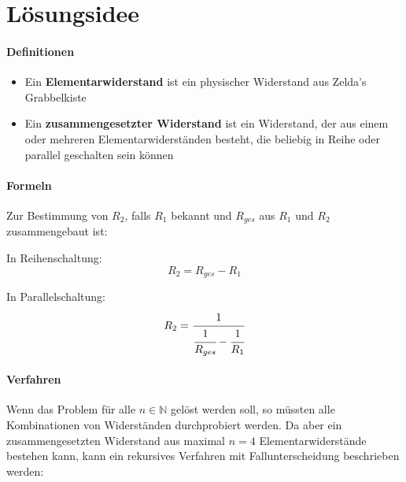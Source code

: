 \documentclass[a4paper,10pt,ngerman]{scrartcl}
\title{\Aufgabe}
\author{\Name\\Team-ID: \TeamId}
\date{\today}
\begin{document}
\maketitle
\tableofcontents

\clearpage

\section{Lösungsidee}

\paragraph{Definitionen}
\begin{itemize}
  \item Ein \textbf{Elementarwiderstand} ist ein physischer Widerstand aus Zelda's Grabbelkiste
  \item Ein \textbf{zusammengesetzter Widerstand} ist ein Widerstand, der aus einem oder mehreren Elementarwiderständen besteht, die beliebig in Reihe oder parallel geschalten sein können
\end{itemize}

\paragraph{Formeln}
Zur Bestimmung von $R_2$, falls $R_1$ bekannt und $R_{ges}$ aus $R_1$ und $R_2$ zusammengebaut ist:
\vspace{10pt}

In Reihenschaltung:
$$R_2 = R_{ges} - R_1$$ 

In Parallelschaltung:
$$R_2 = \cfrac{1}{\cfrac{1}{R_{ges}} - \cfrac{1}{R_1}}$$ 

\paragraph{Verfahren}
Wenn das Problem für alle $n \in \mathbb{N}$ gelöst werden soll, so müssten alle Kombinationen von Widerständen durchprobiert werden. Da aber ein zusammengesetzten Widerstand aus maximal $n = 4$ Elementarwiderstände bestehen kann,
kann ein rekursives Verfahren mit Fallunterscheidung beschrieben werden:
\end{document}
